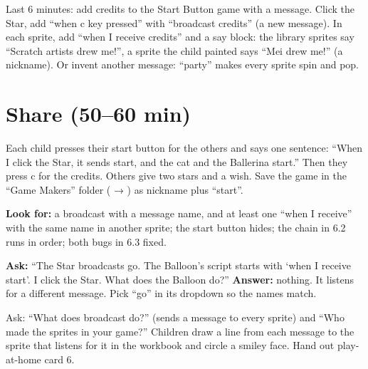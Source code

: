 \begin{freebuild}
Last 6 minutes: add credits to the Start Button game with a message. Click the Star, add \enquote{when c key pressed} with \enquote{broadcast credits} (a new message). In each sprite, add \enquote{when I receive credits} and a say block: the library sprites say \enquote{Scratch artists drew me!}, a sprite the child painted says \enquote{Mei drew me!} (a nickname). Or invent another message: \enquote{party} makes every sprite spin and pop.
\end{freebuild}

\section{Share (50--60 min)}
\begin{teacherscript}
Each child presses their start button for the others and says one sentence: \enquote{When I click the Star, it sends start, and the cat and the Ballerina start.} Then they press c for the credits. Others give two stars and a wish. Save the game in the \enquote{Game Makers} folder ( → ) as nickname plus \enquote{start}.
\end{teacherscript}

\begin{formativecheck}
\textbf{Look for:} a broadcast with a message name, and at least one \enquote{when I receive} with the same name in another sprite; the start button hides; the chain in 6.2 runs in order; both bugs in 6.3 fixed.

\textbf{Ask:} \enquote{The Star broadcasts go. The Balloon's script starts with \enquote{when I receive start}. I click the Star. What does the Balloon do?}
\textbf{Answer:} nothing. It listens for a different message. Pick \enquote{go} in its dropdown so the names match.
\end{formativecheck}

\begin{reflection}
Ask: \enquote{What does broadcast do?} (sends a message to every sprite) and \enquote{Who made the sprites in your game?} Children draw a line from each message to the sprite that listens for it in the workbook and circle a smiley face. Hand out play-at-home card 6.
\end{reflection}

